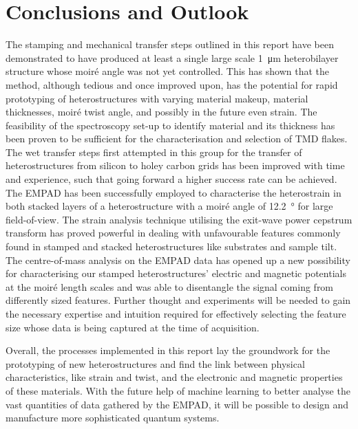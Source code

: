 \section{Conclusions and Outlook}
\label{sec:outlook}
The stamping and mechanical transfer steps outlined in this report have been demonstrated to have produced at least a single large scale \SI{1}{\micro\meter} heterobilayer structure whose moiré angle was not yet controlled. This has shown that the method, although tedious and once improved upon, has the potential for rapid prototyping of heterostructures with varying material makeup, material thicknesses, moiré twist angle, and possibly in the future even strain. The feasibility of the spectroscopy set-up to identify material and its thickness has been proven to be sufficient for the characterisation and selection of TMD flakes. The wet transfer steps first attempted in this group for the transfer of heterostructures from silicon to holey carbon grids has been improved with time and experience, such that going forward a higher success rate can be achieved.\\
The EMPAD has been successfully employed to characterise the heterostrain in both stacked layers of a heterostructure with a moiré angle of \SI{12.2}{\degree} for large field-of-view. The strain analysis technique utilising the exit-wave power cepstrum transform has proved powerful in dealing with unfavourable features commonly found in stamped and stacked heterostructures like substrates and sample tilt. The centre-of-mass analysis on the EMPAD data has opened up a new possibility for characterising our stamped heterostructures' electric and magnetic potentials at the moiré length scales and was able to disentangle the signal coming from differently sized features. Further thought and experiments will be needed to gain the necessary expertise and intuition required for effectively selecting the feature size whose data is being captured at the time of acquisition.

Overall, the processes implemented in this report lay the groundwork for the prototyping of new heterostructures and find the link between physical characteristics, like strain and twist, and the electronic and magnetic properties of these materials. With the future help of machine learning to better analyse the vast quantities of data gathered by the EMPAD, it will be possible to design and manufacture more sophisticated quantum systems.
